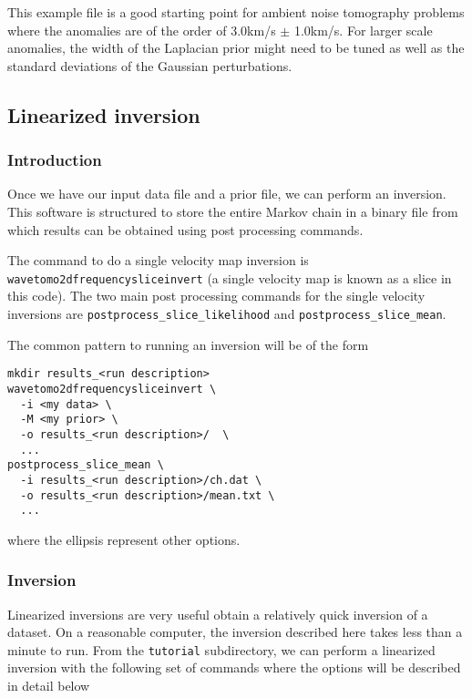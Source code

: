 \documentclass[a4paper,12pt]{article}
\begin{document}
This example file is a good starting point for ambient noise
tomography problems where the anomalies are of the order of 3.0km/s
$\pm$ 1.0km/s. For larger scale anomalies, the width of the Laplacian
prior might need to be tuned as well as the standard deviations of the
Gaussian perturbations.

\subsection{Linearized inversion}
\label{sec:tutoriallinearized}

\subsubsection{Introduction}

Once we have our input data file and a prior file, we can perform an
inversion. This software is structured to store the entire Markov
chain in a binary file from which results can be obtained using
post processing commands.

The command to do a single velocity map inversion is {\tt wavetomo2dfrequencysliceinvert}
(a single velocity map is known as a slice in this code). The
two main post processing commands for the single velocity inversions
are {\tt postprocess\_slice\_likelihood} and {\tt postprocess\_slice\_mean}.

The common pattern to running an inversion will be of the form

\begin{verbatim}
mkdir results_<run description>
wavetomo2dfrequencysliceinvert \
  -i <my data> \
  -M <my prior> \
  -o results_<run description>/  \
  ...
postprocess_slice_mean \
  -i results_<run description>/ch.dat \
  -o results_<run description>/mean.txt \
  ...
\end{verbatim}

where the ellipsis represent other options.

\subsubsection{Inversion}

Linearized inversions are very useful obtain a relatively quick inversion of a dataset.
On a reasonable computer, the inversion described here takes less than a minute to run.
From the {\tt tutorial} subdirectory, we can perform a linearized inversion with the
following set of commands where the options will be described in detail below
\end{document}
